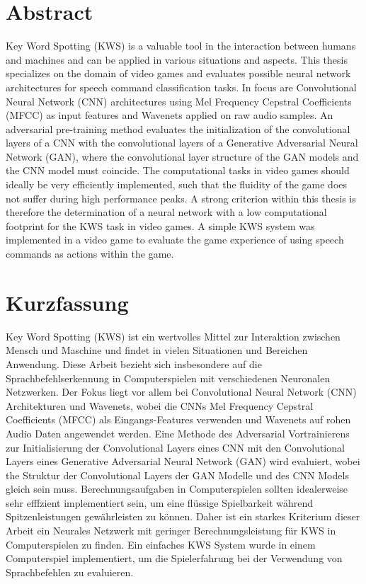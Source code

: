
\chapter*{Abstract}\label{sec:shards_abstract}
Key Word Spotting (KWS) is a valuable tool in the interaction between humans and machines and can be applied in various situations and aspects.
This thesis specializes on the domain of video games and evaluates possible neural network architectures for speech command classification tasks.
In focus are Convolutional Neural Network (CNN) architectures using Mel Frequency Cepstral Coefficients (MFCC) as input features and Wavenets applied on raw audio samples.
An adversarial pre-training method evaluates the initialization of the convolutional layers of a CNN with the convolutional layers of a Generative Adversarial Neural Network (GAN), where the convolutional layer structure of the GAN models and the CNN model must coincide.
The computational tasks in video games should ideally be very efficiently implemented, such that the fluidity of the game does not suffer during high performance peaks.
A strong criterion within this thesis is therefore the determination of a neural network with a low computational footprint for the KWS task in video games.
A simple KWS system was implemented in a video game to evaluate the game experience of using speech commands as actions within the game.



\chapter*{Kurzfassung}
Key Word Spotting (KWS) ist ein wertvolles Mittel zur Interaktion zwischen Mensch und Maschine und findet in vielen Situationen und Bereichen Anwendung.
Diese Arbeit bezieht sich insbesondere auf die Sprachbefehlserkennung in Computerspielen mit verschiedenen Neuronalen Netzwerken.
Der Fokus liegt vor allem bei Convolutional Neural Network (CNN) Architekturen und Wavenets, wobei die CNNs Mel Frequency Cepstral Coefficients (MFCC) als Eingangs-Features verwenden und Wavenets auf rohen Audio Daten angewendet werden.
Eine Methode des Adversarial Vortrainierens zur Initialisierung der Convolutional Layers eines CNN mit den Convolutional Layers eines Generative Adversarial Neural Network (GAN) wird evaluiert, wobei the Struktur der Convolutional Layers der GAN Modelle und des CNN Models gleich sein muss.
Berechnungsaufgaben in Computerspielen sollten idealerweise sehr efffzient implementiert sein, um eine flüssige Spielbarkeit während Spitzenleistungen gewährleisten zu können.
Daher ist ein starkes Kriterium dieser Arbeit ein Neurales Netzwerk mit geringer Berechnungsleistung für KWS in Computerspielen zu finden.
Ein einfaches KWS System wurde in einem Computerspiel implementiert, um die Spielerfahrung bei der Verwendung von Sprachbefehlen zu evaluieren.